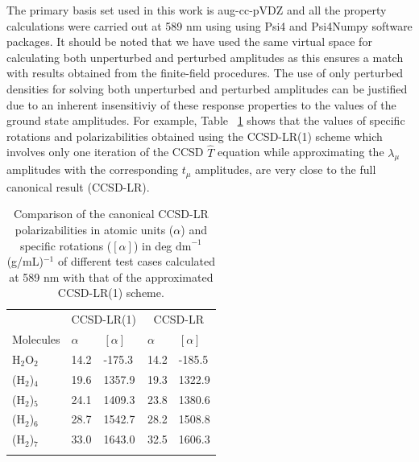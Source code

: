 The primary basis set used in this work is aug-cc-pVDZ\cite{Dunning89,Kendall92,Woon94}
and all the property calculations were carried out at 589 nm using 
using Psi4 and Psi4Numpy software packages.\cite{Parrish17, Smith18}
It should be noted that we have used the same virtual space for calculating both unperturbed
and perturbed amplitudes as this ensures a match with results obtained from
the finite-field procedures. The use of only perturbed densities for solving 
both unperturbed and perturbed amplitudes can be justified due to an inherent
insensitiviy of these response properties to the values of the ground state amplitudes.
For example, Table ~\ref{cclr_justify} shows that the values of specific rotations and polarizabilities 
obtained using the CCSD-LR(1) scheme which involves only one iteration of the CCSD $\hat{T}$ equation while 
approximating the $\lambda_\mu$ amplitudes with the corresponding $t_\mu$ amplitudes, are very close to 
the full canonical result (CCSD-LR).
 \begin{table}[h]
 \caption{{\footnotesize Comparison of the canonical CCSD-LR polarizabilities in atomic units ($\alpha$) and specific rotations ($[\alpha]$) in deg $\text{dm}^{-1}$(g/mL)$^{-1}$ of different test cases calculated at 589 nm with that of the approximated CCSD-LR(1) scheme.}}
\centering
\begin{tabular}{lllll}
\hline
 & \multicolumn{2}{c}{CCSD-LR(1)} & \multicolumn{2}{c}{CCSD-LR} \\
\cline{2-5}
 Molecules & $\alpha$ & $[\alpha]$ & $\alpha$ & $[\alpha]$ \\ %
\hline
H$_2$O$_2$  & 14.2 & -175.3 &  14.2 &  -185.5   \\
\hline
(H$_2$)$_4$ & 19.6 & 1357.9 &  19.3 &  1322.9 \\
\hline
(H$_2$)$_5$ & 24.1  & 1409.3 & 23.8 &  1380.6  \\
\hline
(H$_2$)$_6$ & 28.7 & 1542.7 & 28.2 &   1508.8 \\
\hline
(H$_2$)$_7$ & 33.0 & 1643.0 & 32.5 &   1606.3  \\
\hline
\\
\end{tabular}
\label{cclr_justify}
\end{table}
